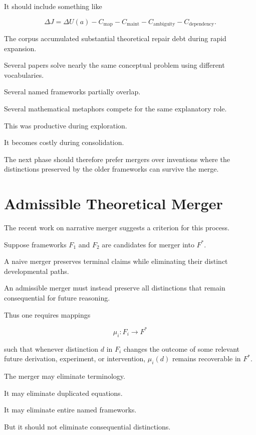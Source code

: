 \documentclass[11pt]{article}
\theoremstyle{remark}
\begin{document}
It should include something like

\begin{equation}
\Delta J
=
\Delta U(a)
-
C_{\mathrm{map}}
-
C_{\mathrm{maint}}
-
C_{\mathrm{ambiguity}}
-
C_{\mathrm{dependency}}.
\end{equation}

The corpus accumulated substantial theoretical repair debt during rapid
expansion.

Several papers solve nearly the same conceptual problem using different
vocabularies.

Several named frameworks partially overlap.

Several mathematical metaphors compete for the same explanatory role.

This was productive during exploration.

It becomes costly during consolidation.

The next phase should therefore prefer mergers over inventions where the
distinctions preserved by the older frameworks can survive the merge.

\section{Admissible Theoretical Merger}

The recent work on narrative merger suggests a criterion for this process.

Suppose frameworks $F_1$ and $F_2$ are candidates for merger into $F^\ast$.

A naive merger preserves terminal claims while eliminating their distinct
developmental paths.

An admissible merger must instead preserve all distinctions that remain
consequential for future reasoning.

Thus one requires mappings

\begin{equation}
\mu_i:F_i\rightarrow F^\ast
\end{equation}

such that whenever distinction $d$ in $F_i$ changes the outcome of some relevant
future derivation, experiment, or intervention, $\mu_i(d)$ remains recoverable
in $F^\ast$.

The merger may eliminate terminology.

It may eliminate duplicated equations.

It may eliminate entire named frameworks.

But it should not eliminate consequential distinctions.
\end{document}
